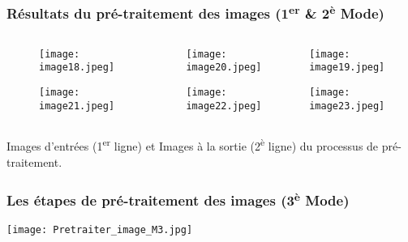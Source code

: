 \documentclass{beamer}
\begin{document}
\begin{frame}
\frametitle{Résultats du pré-traitement des images (1\textsuperscript{er} \& 2\textsuperscript{è} Mode)}
\begin{columns}
\begin{column}{0.33\textwidth}
\begin{figure}
\begin{center}
    \texttt{[image: image18.jpeg]}

    \vspace{0.5cm}

    \texttt{[image: image21.jpeg]}
\end{center}
\end{figure}
\end{column}

\begin{column}{0.33\textwidth}
\begin{center}
    \texttt{[image: image20.jpeg]}

    \vspace{0.5cm}

    \texttt{[image: image22.jpeg]}
\end{center}
\end{column}

\begin{column}{0.33\textwidth}
\begin{center}
    \texttt{[image: image19.jpeg]}

    \vspace{0.5cm}

    \texttt{[image: image23.jpeg]}
\end{center}
\end{column}
\end{columns}
\medskip
Images d'entrées (1\textsuperscript{er} ligne) et Images à la sortie (2\textsuperscript{è} ligne) du processus de pré-traitement.
\end{frame}

\begin{frame}
\frametitle{Les étapes de pré-traitement des images (3\textsuperscript{è} Mode)}
\centering
    \texttt{[image: Pretraiter\_image\_M3.jpg]}
\end{frame}
\end{document}
